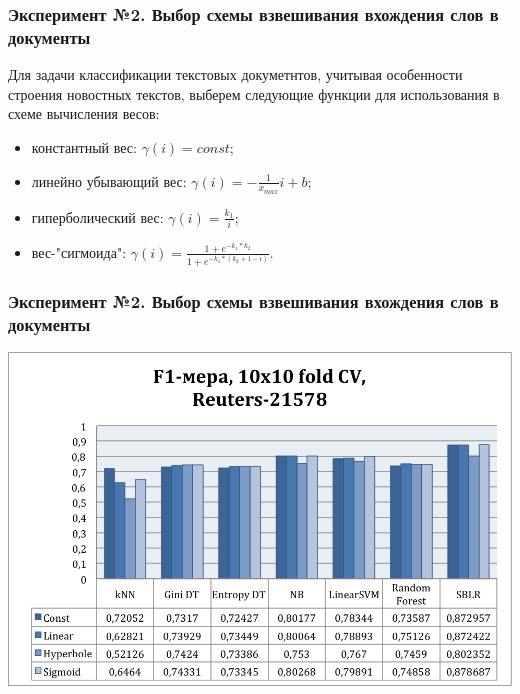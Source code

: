 \documentclass{beamer}
\begin{document}
\begin{frame}
\frametitle{Эксперимент №2. Выбор схемы взвешивания вхождения слов в документы}
Для задачи классификации текстовых докуметнтов, учитывая особенности строения новостных текстов,
выберем следующие функции для использования в схеме вычисления весов:
\newline
\\
\begin{itemize}
	\item{константный вес: $\gamma(i)=const$;}
	\item{линейно убывающий вес: $\gamma(i)=-\frac{1}{x_{max}}i+b$;}
	\item{гиперболический вес: $\gamma(i)=\frac{k_1}{i}$;}
	\item{вес-"сигмоида": $\gamma(i)=\frac{1+e^{-k_1*k_2}}{1+e^{-k_1*(k_2+1-i)}}$.}
\end{itemize}
\end{frame}

\begin{frame}
\frametitle{Эксперимент №2. Выбор схемы взвешивания вхождения слов в документы}
\begin{center}
    \includegraphics[width=\linewidth,height=0.7\textheight,align=\center, trim=4 4 4 4, clip, keepaspectratio]{weighting.png}
\end{center}
\end{frame}
\end{document}
